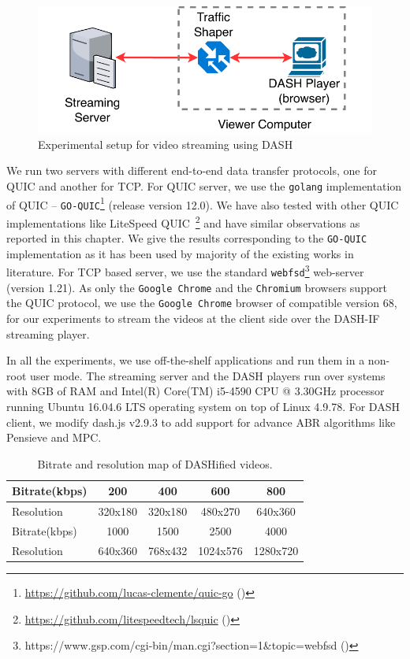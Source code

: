 \begin{figure}[h]
	\centering
	\includegraphics[width=0.8\linewidth]{img/experimental_setup}
	\caption{\label{fig:chap03s2:expeirmental_setup}Experimental setup for video streaming using DASH}
\end{figure}

We run two servers with different end-to-end data transfer protocols, one for \ac{QUIC} and another for \ac{TCP}. For \ac{QUIC} server, we use the {\tt golang} implementation of \ac{QUIC} -- \texttt{GO-QUIC}\footnote{\url{https://github.com/lucas-clemente/quic-go} (\lastaccessedtoday)} (release version 12.0). We have also tested with other \ac{QUIC} implementations like LiteSpeed \ac{QUIC}~\footnote{\url{https://github.com/litespeedtech/lsquic} (\lastaccessedtoday)} and have similar observations as reported in this chapter. We give the results corresponding to the \texttt{GO-QUIC} implementation as it has been used by majority of the existing works in literature. For TCP based server, we use the standard {\tt webfsd}\footnote{https://www.gsp.com/cgi-bin/man.cgi?section=1\&topic=webfsd (\lastaccessedtoday)} web-server (version 1.21). As only the {\tt Google Chrome} and the {\tt Chromium} browsers support the \ac{QUIC} protocol, we use the {\tt Google Chrome} browser of compatible version 68, for our experiments to stream the videos at the client side over the \ac{DASH-IF} streaming player.


In all the experiments, we use off-the-shelf applications and run them in a non-root user mode. The streaming server and the \ac{DASH} players run over systems with 8GB of RAM and Intel(R) Core(TM) i5-4590 CPU @ 3.30GHz processor running Ubuntu 16.04.6 LTS operating system on top of Linux 4.9.78. For \ac{DASH} client, we modify dash.js v2.9.3 to add support for advance \ac{ABR} algorithms like Pensieve and MPC.


\begin{table}[h]
     \caption{\label{table:chap03s2:bitrate}Bitrate and resolution map of DASHified videos.}
	\centering
	\begin{tabular}{|l|c|c|c|c|}
		\hline
		Bitrate(kbps) & 200 & 400 & 600 & 800 \\ \hline
		Resolution & 320x180 & 320x180 & 480x270 & 640x360 \\ \hline \hline
		Bitrate(kbps) & 1000 & 1500 & 2500 & 4000 \\ \hline
		Resolution & 640x360 & 768x432 & 1024x576 & 1280x720 \\ \hline
	\end{tabular}
\end{table}

